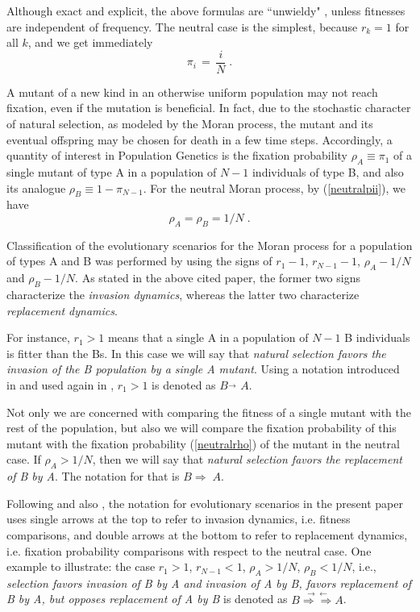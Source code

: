 \documentclass[12pt]{article}
\begin{document}
Although exact and explicit, the above formulas are ``unwieldy" \cite{ewens}, unless fitnesses are independent of frequency. The neutral case is the simplest, because $r_k=1$ for all $k$, and we get immediately
\begin{equation}  \label{neutralpii}
\pi_i \,=\, \frac{i}{N}\;.
\end{equation}

A mutant of a new kind in an otherwise uniform population may not reach fixation, even if the mutation is beneficial. In fact, due to the stochastic character of natural selection, as modeled by the Moran process, the mutant and its eventual offspring may be chosen for death in a few time steps. Accordingly, a quantity of interest in Population Genetics is the fixation probability $\rho_A \equiv \pi_1$ of a single mutant of type A in a population of $N-1$ individuals of type B, and also its analogue  $\rho_B \equiv 1-\pi_{N-1}$. For the neutral Moran process, by (\ref{neutralpii}), we have 
\begin{equation}  \label{neutralrho}
\rho_A=\rho_B=1/N\;.
\end{equation}

Classification of the evolutionary scenarios for the Moran process for a population of types A and B was performed by \cite{taylor} using the signs of $r_1-1$, $r_{N-1}-1$, $\rho_A-1/N$ and $\rho_B-1/N$. As stated in the above cited paper, the former two signs characterize the \textit{invasion dynamics}, whereas the latter two characterize \textit{replacement dynamics}.

For instance, $r_1>1$ means that a single A in a population of $N-1$ B individuals is fitter than the Bs. In this case we will say that \textit{natural selection favors the invasion of the B population by a single A mutant}. Using a notation introduced in \cite{taylor} and used again in \cite{AntalScheuring}, $r_1>1$ is denoted as $B\stackrel{\rightarrow \;\;}{\;\;} A$.

Not only we are concerned with comparing the fitness of a single mutant with the rest of the population, but also we will compare the fixation probability of this mutant with the fixation probability  (\ref{neutralrho}) of the mutant in the neutral case. If $\rho_A>1/N$, then we will say that \textit{natural selection favors the replacement of B by A}. The notation for that is $B\stackrel{}{\Rightarrow \;} A$.

Following \cite{taylor} and also \cite{AntalScheuring}, the notation for evolutionary scenarios in the present paper uses single arrows at the top to refer to invasion dynamics, i.e. fitness comparisons, and double arrows at the bottom to refer to replacement dynamics, i.e. fixation probability comparisons with respect to the neutral case. One example to illustrate: the case $r_1>1$, $r_{N-1}<1$, $\rho_A>1/N$, $\rho_B <1/N$, i.e., \textit{selection favors invasion of B by A and invasion of A by B, favors replacement of B by A, but opposes replacement of A by B} is denoted as $B\stackrel{\rightarrow \leftarrow}{\Rightarrow \Rightarrow} A$.
\end{document}
